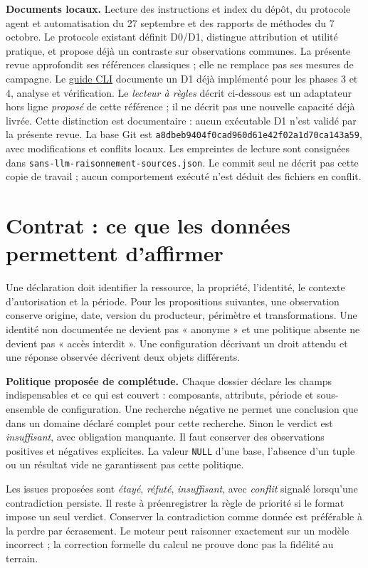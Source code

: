 \documentclass[11pt,a4paper]{article}
\newcommand{\code}[1]{\nolinkurl{#1}}
\begin{document}
\textbf{Documents locaux.} Lecture des instructions et index du dépôt, du
protocole agent et automatisation du 27 septembre et des rapports de méthodes du
7 octobre. Le protocole existant définit D0/D1, distingue attribution et utilité
pratique, et propose déjà un contraste sur observations communes. La présente
revue approfondit ses références classiques ; elle ne remplace pas ses mesures
de campagne. Le \href{../../docs/benchmark/agent-vs-automation-cli.md}{guide CLI}
documente un D1 déjà implémenté pour les phases 3 et 4,
analyse et vérification. Le \emph{lecteur à règles} décrit ci-dessous est un
adaptateur hors ligne \emph{proposé} de cette référence ; il ne décrit pas une
nouvelle capacité déjà livrée. Cette distinction est documentaire : aucun
exécutable D1 n'est validé par la présente revue. La base Git est
\code{a8dbeb9404f0cad960d61e42f02a1d70ca143a59}, avec modifications et conflits
locaux. Les empreintes de lecture sont consignées dans
\code{sans-llm-raisonnement-sources.json}. Le commit seul ne décrit pas cette
copie de travail ; aucun comportement exécuté n'est déduit des fichiers en conflit.

\section{Contrat : ce que les données permettent d'affirmer}
Une déclaration doit identifier la ressource, la propriété, l'identité, le
contexte d'autorisation et la période. Pour les propositions suivantes, une
observation conserve origine, date, version du producteur, périmètre et
transformations. Une identité non documentée ne devient pas « anonyme » et une
politique absente ne devient pas « accès interdit ». Une configuration décrivant
un droit attendu et une réponse observée décrivent deux objets différents.

\textbf{Politique proposée de complétude.} Chaque dossier déclare les champs
indispensables et ce qui est couvert : composants, attributs, période et
sous-ensemble de configuration. Une recherche négative ne permet une conclusion
que dans un domaine déclaré complet pour cette recherche. Sinon le verdict est
\emph{insuffisant}, avec obligation manquante. Il faut conserver des observations
positives et négatives explicites. La valeur \code{NULL} d'une base, l'absence
d'un tuple ou un résultat vide ne garantissent pas cette politique.

Les issues proposées sont \emph{étayé}, \emph{réfuté}, \emph{insuffisant},
avec \emph{conflit} signalé lorsqu'une contradiction persiste. Il reste à
préenregistrer la règle de priorité si le format impose un seul verdict.
Conserver la contradiction comme donnée est préférable à la perdre par
écrasement. Le moteur peut raisonner exactement sur un modèle incorrect ;
la correction formelle du calcul ne prouve donc pas la fidélité au terrain.
\end{document}
